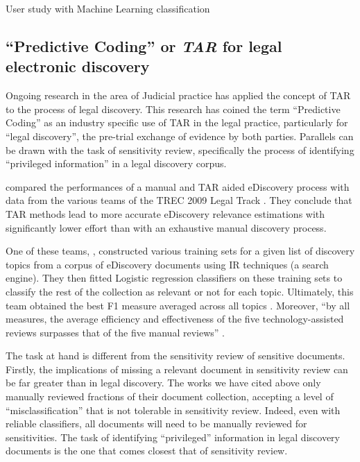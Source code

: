 \documentclass{l4proj}
\begin{document}
\autocite{mcdonaldHowSensitivityClassification2019} User study with Machine Learning classification

\subsection{``Predictive Coding'' or \textit{TAR} for legal electronic discovery}

Ongoing research in the area of Judicial practice has applied the concept of TAR to the process of legal discovery.
This research has coined the term ``Predictive Coding'' \autocite{carrollGrossmancormackGlossaryTechnologyassisted2013} as an industry specific use of TAR in the legal practice, particularly for ``legal discovery'', the pre-trial exchange of evidence by both parties.
Parallels can be drawn with the task of sensitivity review, specifically the process of identifying ``privileged information'' in a legal discovery corpus.

\textcite{grossmanTechnologyAssistedReviewEDiscovery2010} compared the performances of a manual and TAR aided eDiscovery process with data from the various teams of the TREC 2009 Legal Track \autocite{hedinOverviewTREC2009}.
They conclude that TAR methods lead to more accurate eDiscovery relevance estimations with significantly lower effort than with an exhaustive manual discovery process.


One of these teams, \textcite{cormackMachineLearningInformation2009}, constructed various training sets for a given list of discovery topics from a corpus of eDiscovery documents using IR techniques (a search engine).
They then fitted Logistic regression classifiers on these training sets to classify the rest of the collection as relevant or not for each topic.
Ultimately, this team obtained the best F1 measure averaged across all topics \autocite{hedinOverviewTREC2009}.
Moreover, ``by all measures, the average efficiency and effectiveness of the five technology-assisted reviews surpasses that of the five manual reviews'' \autocite[p.~43]{grossmanTechnologyAssistedReviewEDiscovery2010}.

The task at hand is different from the sensitivity review of sensitive documents.
Firstly, the implications of missing a relevant document in sensitivity review can be far greater than in legal discovery.
The works we have cited above only manually reviewed fractions of their document collection, accepting a level of ``misclassification'' that is not tolerable in sensitivity review.
Indeed, even with reliable classifiers, all documents will need to be manually reviewed for sensitivities.
The task of identifying ``privileged'' information in legal discovery documents is the one that comes closest that of sensitivity review.
\end{document}
